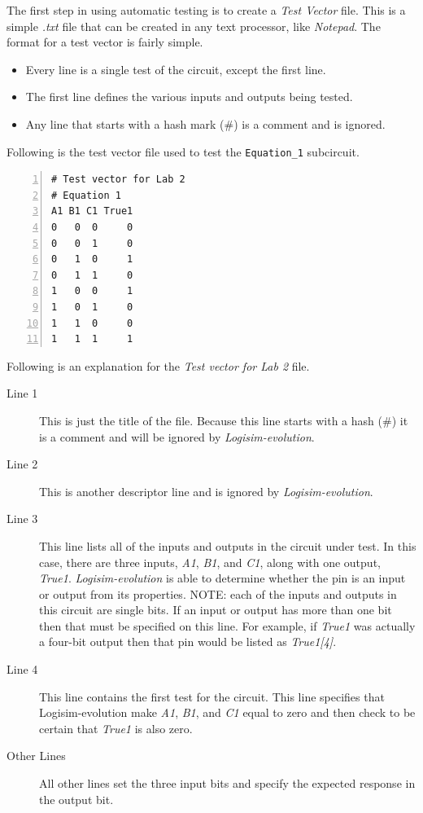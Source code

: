 The first step in using automatic testing is to create a \textit{Test Vector} file. This is a simple \textit{.txt} file that can be created in any text processor, like \textit{Notepad}.  The format for a test vector is fairly simple.

\begin{itemize}
	\item Every line is a single test of the circuit, except the first line.
	\item The first line defines the various inputs and outputs being tested.
	\item Any line that starts with a hash mark (\#) is a comment and is ignored.
\end{itemize}

Following is the test vector file used to test the \lstinline[columns=fixed]|Equation_1| subcircuit.

\begin{Verbatim}[frame=lines,
								 numbers=left,
								 xleftmargin=10mm,
								 xrightmargin=10mm]
# Test vector for Lab 2
# Equation 1
A1 B1 C1 True1
0   0  0     0
0   0  1     0
0   1  0     1
0   1  1     0
1   0  0     1
1   0  1     0
1   1  0     0
1   1  1     1
\end{Verbatim}

Following is an explanation for the \textit{Test vector for Lab 2} file.

\begin{description}
	\item[Line 1] This is just the title of the file. Because this line starts with a hash (\#) it is a comment and will be ignored by \textit{Logisim-evolution}.
	\item[Line 2] This is another descriptor line and is ignored by \textit{Logisim-evolution}.
	\item[Line 3] This line lists all of the inputs and outputs in the circuit under test. In this case, there are three inputs, \textit{A1}, \textit{B1}, and \textit{C1}, along with one output, \textit{True1}. \textit{Logisim-evolution} is able to determine whether the pin is an input or output from its properties. NOTE: each of the inputs and outputs in this circuit are single bits. If an input or output has more than one bit then that must be specified on this line. For example, if \textit{True1} was actually a four-bit output then that pin would be listed as \textit{True1[4]}.
	\item[Line 4] This line contains the first test for the circuit. This line specifies that Logisim-evolution make \textit{A1}, \textit{B1}, and \textit{C1} equal to zero and then check to be certain that \textit{True1} is also zero.
	\item[Other Lines] All other lines set the three input bits and specify the expected response in the output bit.
\end{description}

